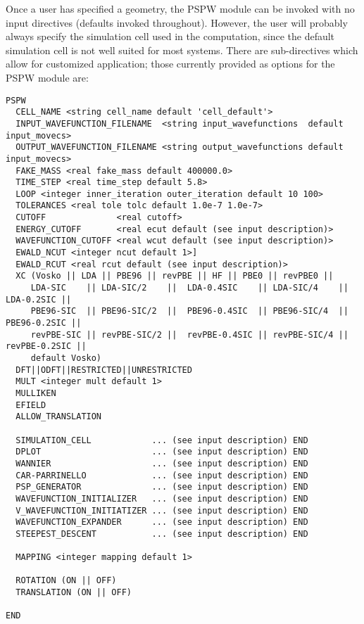 Once a user has specified a geometry, the PSPW module can be invoked
with no input  directives (defaults invoked throughout).  However, the
user will probably always specify the  simulation cell used in the
computation, since the default simulation cell is not well suited for
most systems.  There are sub-directives which allow for customized
application; those currently provided as options for the PSPW module are:
\begin{verbatim}
PSPW
  CELL_NAME <string cell_name default 'cell_default'>
  INPUT_WAVEFUNCTION_FILENAME  <string input_wavefunctions  default input_movecs>
  OUTPUT_WAVEFUNCTION_FILENAME <string output_wavefunctions default input_movecs>
  FAKE_MASS <real fake_mass default 400000.0>
  TIME_STEP <real time_step default 5.8>
  LOOP <integer inner_iteration outer_iteration default 10 100>
  TOLERANCES <real tole tolc default 1.0e-7 1.0e-7>
  CUTOFF              <real cutoff>
  ENERGY_CUTOFF       <real ecut default (see input description)>
  WAVEFUNCTION_CUTOFF <real wcut default (see input description)>
  EWALD_NCUT <integer ncut default 1>]
  EWALD_RCUT <real rcut default (see input description)>
  XC (Vosko || LDA || PBE96 || revPBE || HF || PBE0 || revPBE0 || 
     LDA-SIC    || LDA-SIC/2    ||  LDA-0.4SIC    || LDA-SIC/4    || LDA-0.2SIC ||
     PBE96-SIC  || PBE96-SIC/2  ||  PBE96-0.4SIC  || PBE96-SIC/4  || PBE96-0.2SIC ||
     revPBE-SIC || revPBE-SIC/2 ||  revPBE-0.4SIC || revPBE-SIC/4 || revPBE-0.2SIC ||
     default Vosko)
  DFT||ODFT||RESTRICTED||UNRESTRICTED
  MULT <integer mult default 1>
  MULLIKEN
  EFIELD
  ALLOW_TRANSLATION

  SIMULATION_CELL            ... (see input description) END
  DPLOT                      ... (see input description) END
  WANNIER                    ... (see input description) END
  CAR-PARRINELLO             ... (see input description) END
  PSP_GENERATOR              ... (see input description) END
  WAVEFUNCTION_INITIALIZER   ... (see input description) END
  V_WAVEFUNCTION_INITIATIZER ... (see input description) END
  WAVEFUNCTION_EXPANDER      ... (see input description) END
  STEEPEST_DESCENT           ... (see input description) END

  MAPPING <integer mapping default 1>

  ROTATION (ON || OFF)
  TRANSLATION (ON || OFF)

END 
\end{verbatim}

